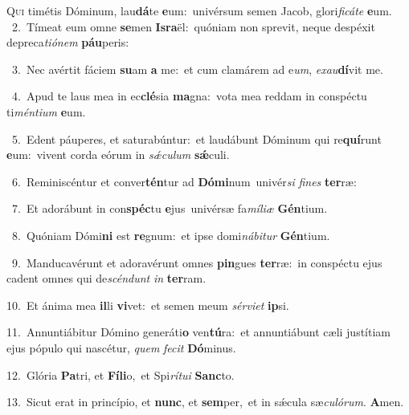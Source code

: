 \lettrine{\initial\textcolor{\initialcolor}{Q}}{ui} timétis Dóminum, lau\-\textbf{dá}\-te \textbf{e}\-um:~\star univérsum semen Jacob, glori\-\textit{fi}\-\textit{cá}\textit{te} \textbf{e}\-um.\\
{\numbfont\textcolor{\numbcolor}{~2.}}~Tímeat eum omne \textbf{se}\-men \textbf{Is}\-\textbf{ra}ël:~\star quóniam non sprevit, neque despéxit depreca\-\textit{ti}\-\textit{ó}\textit{nem} \textbf{páu}\-peris:\par
{\numbfont\textcolor{\numbcolor}{~3.}}~Nec avértit fáciem \textbf{su}\-am \textbf{a} me:~\star et cum clamárem ad e\-\textit{um}\-, \textit{ex}\-\textit{au}\textbf{dí}vit me.\par
{\numbfont\textcolor{\numbcolor}{~4.}}~Apud te laus mea in ec\-\textbf{clé}\-sia \textbf{ma}\-gna:~\star vota mea reddam in conspéctu ti\-\textit{mén}\-\textit{ti}\textit{um} \textbf{e}\-um.\par
{\numbfont\textcolor{\numbcolor}{~5.}}~Edent páuperes, et saturabúntur:~\dagger et laudábunt Dóminum qui re\-\textbf{quí}\-runt \textbf{e}\-um:~\star vivent corda eórum in \textit{sǽ}\-\textit{cu}\textit{lum} \textbf{sǽ}\-culi.\par
{\numbfont\textcolor{\numbcolor}{~6.}}~Reminiscéntur et conver\-\textbf{tén}\-tur ad \textbf{Dó}\-\textbf{mi}num~\star univér\textit{si} \textit{fi}\-\textit{nes} \textbf{ter}\-ræ:\par
{\numbfont\textcolor{\numbcolor}{~7.}}~Et adorábunt in con\-\textbf{spéc}\-tu \textbf{e}\-jus~\star univérsæ fa\-\textit{mí}\-\textit{li}\textit{æ} \textbf{Gén}\-tium.\par
{\numbfont\textcolor{\numbcolor}{~8.}}~Quóniam Dómi\textbf{ni} est \textbf{re}\-gnum:~\star et ipse domi\-\textit{ná}\-\textit{bi}\textit{tur} \textbf{Gén}\-tium.\par
{\numbfont\textcolor{\numbcolor}{~9.}}~Manducavérunt et adoravérunt omnes \textbf{pin}\-gues \textbf{ter}\-ræ:~\star in conspéctu ejus cadent omnes qui de\-\textit{scén}\-\textit{dunt} \textit{in} \textbf{ter}\-ram.\par
{\numbfont\textcolor{\numbcolor}{10.}}~Et ánima mea \textbf{il}\-li \textbf{vi}\-vet:~\star et semen meum \textit{sér}\-\textit{vi}\textit{et} \textbf{ip}\-si.\par
{\numbfont\textcolor{\numbcolor}{11.}}~Annuntiábitur Dómino generáti\textbf{o} ven\-\textbf{tú}\-ra:~\star et annuntiábunt cæli justítiam ejus pópulo qui nascétur, \textit{quem} \textit{fe}\-\textit{cit} \textbf{Dó}\-minus.\par
{\numbfont\textcolor{\numbcolor}{12.}}~Glória \textbf{Pa}\-tri, et \textbf{Fí}\-\textbf{li}o,~\star et Spi\-\textit{rí}\-\textit{tu}\textit{i} \textbf{Sanc}\-to.\par
{\numbfont\textcolor{\numbcolor}{13.}}~Sicut erat in princípio, et \textbf{nunc}\-, et \textbf{sem}\-per,~\star et in sǽcula sæ\-\textit{cu}\-\textit{ló}\textit{rum}. \textbf{A}\-men.\par
